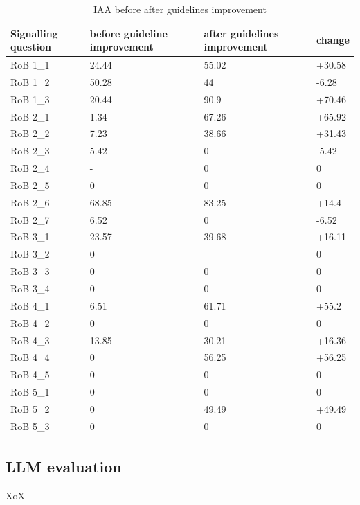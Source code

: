 \documentclass[sn-mathphys,Numbered]{sn-jnl}%
\theoremstyle{thmstyleone}%
\theoremstyle{thmstyletwo}%
\theoremstyle{thmstylethree}%
\begin{document}
\begin{table}[!ht]
    \caption{IAA before after guidelines improvement}
    \label{table:IAA_sq}
    \centering
    \begin{tabular}{llll}
    \hline
        Signalling question & before guideline improvement & after guidelines improvement & change \\
    \hline
        RoB 1\_1 & 24.44 & 55.02 & +30.58 \\ 
        RoB 1\_2 & 50.28 & 44 & -6.28 \\ 
        RoB 1\_3 & 20.44 & 90.9 & +70.46 \\ 
        RoB 2\_1 & 1.34 & 67.26 & +65.92 \\ 
        RoB 2\_2 & 7.23 & 38.66 & +31.43 \\ 
        RoB 2\_3 & 5.42 & 0 & -5.42 \\ 
        RoB 2\_4 & - & 0 & 0 \\ 
        RoB 2\_5 & 0 & 0 & 0 \\ 
        RoB 2\_6 & 68.85 & 83.25 & +14.4 \\ 
        RoB 2\_7 & 6.52 & 0 & -6.52 \\ 
        RoB 3\_1 & 23.57 & 39.68 & +16.11 \\ 
        RoB 3\_2 & 0 & ~ & 0 \\ 
        RoB 3\_3 & 0 & 0 & 0 \\ 
        RoB 3\_4 & 0 & 0 & 0 \\ 
        RoB 4\_1 & 6.51 & 61.71 & +55.2 \\ 
        RoB 4\_2 & 0 & 0 & 0 \\ 
        RoB 4\_3 & 13.85 & 30.21 & +16.36 \\ 
        RoB 4\_4 & 0 & 56.25 & +56.25 \\ 
        RoB 4\_5 & 0 & 0 & 0 \\ 
        RoB 5\_1 & 0 & 0 & 0 \\ 
        RoB 5\_2 & 0 & 49.49 & +49.49 \\ 
        RoB 5\_3 & 0 & 0 & 0 \\ \hline
    \end{tabular}
\end{table}
%
%
%
\subsection{LLM evaluation}
%
XoX
%
%
%
\end{document}
